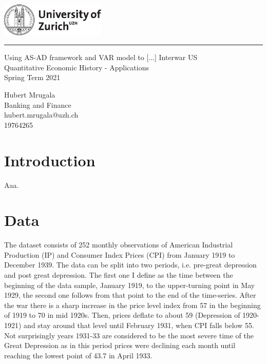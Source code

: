 \documentclass[a4paper,12pt]{article}
\begin{document}
\begin{titlepage}
\noindent\includegraphics[width=5cm]{uzh_logo_e_pos.pdf}
\noindent\rule{\textwidth}{0.4pt}
\vspace{1cm}
  \begin{center}
		{\LARGE Using AS-AD framework and VAR model to [...] Interwar US} \\
		{\Large Quantitative Economic History - Applications\\Spring Term 2021}
  \end{center}
\vfill

{\flushleft
Hubert Mrugala \\
Banking and Finance\\
hubert.mrugala@uzh.ch\\
19764265}  

\end{titlepage}

\pagebreak
\pagebreak

\section{Introduction}

Aaa.
\newpage

\section{Data}

The dataset consists of 252 monthly observations of American Industrial Production (IP) and Consumer Index Prices (CPI) from January 1919 to December 1939. The data can be split into two periods, i.e. pre-great depression and post great depression. The first one I define as the time between the beginning of the data sample, January 1919, to the upper-turning point in May 1929, the second one follows from that point to the end of the time-series. After the war there is a sharp increase in the price level index from 57 in the beginning of 1919 to 70 in mid 1920s. Then, prices deflate to about 59 (Depression of 1920-1921) and stay around that level until February 1931, when CPI falls below 55. Not surprisingly years 1931-33 are considered to be the most severe time of the Great Depression as in this period prices were declining each month until reaching the lowest point of 43.7 in April 1933.
\end{document}
